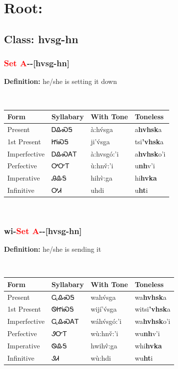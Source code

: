 \needspace{4in}
\section*{Root: }
\markboth{}{}
\nopagebreak
{}
\needspace{3in}
\subsection*{Class: hvsg-hn}
\nopagebreak
\needspace{2in}
\subsubsection*{\textcolor{Red}{Set A}{-}\textbf{}{-}[hvsg-hn]}
\nopagebreak
\textbf{Definition: } he/she is setting it down
\\[0.5em]
\begin{tabularx}{\textwidth}{l X X X}%
\toprule%
\textbf{Form}&\textbf{Syllabary}&\textbf{With Tone}&\textbf{Toneless}\\%
\midrule%
Present&ᎠᎲᏍᎦ&à:hv́sga&a\textbf{hvhsk}a\\%
1st Present&ᏥᎥᏍᎦ&ji’v́sga&tsi\textbf{'vhsk}a\\%
Imperfective&ᎠᎲᏍᎪᎢ&à:hvsgó:’i&a\textbf{hvhsk}o'i\\%
Perfective&ᎤᏅᎢ&ù:hnv̌:’i&u\textbf{nh}v'i\\%
Imperative&ᎯᎲᎦ&hihv̀:ga&hi\textbf{hvka}\\%
Infinitive&ᎤᏗ&uhdi&u\textbf{ht}i\\%
\bottomrule%
\end{tabularx}
\\[1em]
\needspace{2in}
\subsubsection*{wi{-}\textcolor{Red}{Set A}{-}\textbf{}{-}[hvsg-hn]}
\nopagebreak
\textbf{Definition: } he/she is sending it
\\[0.5em]
\begin{tabularx}{\textwidth}{l X X X}%
\toprule%
\textbf{Form}&\textbf{Syllabary}&\textbf{With Tone}&\textbf{Toneless}\\%
\midrule%
Present&ᏩᎲᏍᎦ&wahv́sga&wa\textbf{hvhsk}a\\%
1st Present&ᏫᏥᎥᏍᎦ&wijí’v́sga&witsi\textbf{'vhsk}a\\%
Imperfective&ᏩᎲᏍᎪᎢ&wáhv́sgó:’i&wa\textbf{hvhsk}o'i\\%
Perfective&ᏭᏅᎢ&wù:hnv̌:’i&wu\textbf{nh}v'i\\%
Imperative&ᏫᎲᎦ&hwihv̂:ga&whi\textbf{hvka}\\%
Infinitive&ᏭᏗ&wù:hdi&wu\textbf{ht}i\\%
\bottomrule%
\end{tabularx}
\\[1em]
\needspace{3in}
